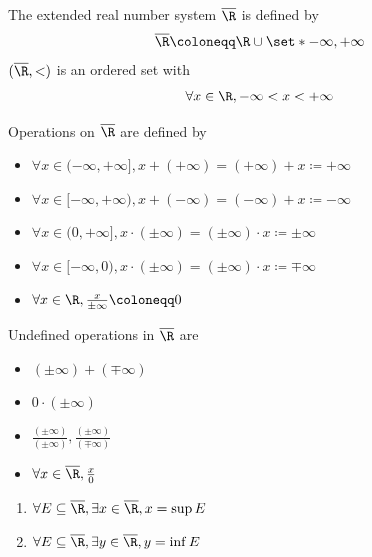 \begin{definition} \label{an1:def:extended-real-number-system}
  The extended real number system $\overline{\R}$ is defined by
  \[
    \overline{\R} \coloneqq \R \cup \set*{- \infty, + \infty}
  \]
  $(\overline{\R}, <)$ is an ordered set with
  \[
    \forall x \in \R, - \infty < x < + \infty
  \]
\end{definition}

\begin{definition} \label{an1:def:operations-on-extended-real-number-system}
  Operations on $\overline{\R}$ are defined by
  \begin{itemize}
    \item $\forall x \in (- \infty, + \infty], x + (+ \infty) = (+ \infty) + x \coloneqq + \infty$
    \item $\forall x \in [- \infty, + \infty), x + (- \infty) = (- \infty) + x \coloneqq - \infty$
    \item $\forall x \in (0, + \infty], x \cdot (\pm \infty) = (\pm \infty) \cdot x \coloneqq \pm \infty$
    \item $\forall x \in [- \infty, 0), x \cdot (\pm \infty) = (\pm \infty) \cdot x \coloneqq \mp \infty$
    \item $\forall x \in \R, \frac{x}{\pm \infty} \coloneqq 0$
  \end{itemize}
  Undefined operations in $\overline{\R}$ are
  \begin{itemize}
    \item $(\pm \infty) + (\mp \infty)$
    \item $0 \cdot (\pm \infty)$
    \item $\frac{(\pm \infty)}{(\pm \infty)}, \frac{(\pm \infty)}{(\mp \infty)}$
    \item $\forall x \in \overline{\R}, \frac{x}{0}$
  \end{itemize}
\end{definition}

\begin{theorem} \label{an1:thm:supremum-infimum-in-extended-real-number-system}
  \leavevmode\par
  \begin{enumerate}[label=\textbf{(\Alph*)}]
    \item $\forall E \subseteq \overline{\R}, \exists x \in \overline{\R}, x = \sup E$
    \item $\forall E \subseteq \overline{\R}, \exists y \in \overline{\R}, y = \inf E$
  \end{enumerate}
\end{theorem}


